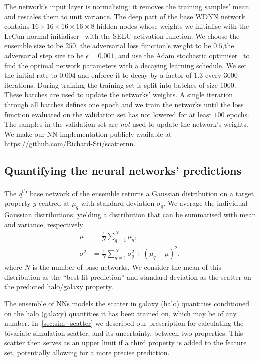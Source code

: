 \documentclass[usenatbib,useAMS]{mnras}
\begin{document}
The network's input layer is normalising: it removes the training samples' mean and rescales them to unit variance. The deep part of the base WDNN network contains $16\times 16\times 16\times 16 \times 8$ hidden nodes whose weights we initialise with the LeCun normal initialiser~\citep{lecun-98b} with the SELU activation function.  We choose the ensemble size to be $250$, the adversarial loss function's weight to be $0.5$,the adversarial step size to be $\epsilon=0.001$, and use the Adam stochastic optimiser~\citep{Adam_Kingma} to find the optimal network parameters with a decaying learning schedule. We set the initial rate to $0.004$ and enforce it to decay by a factor of $1.3$ every $3000$ iterations.
During training the training set is split into batches of size $1000$. These batches are used to update the networks' weights. A single iteration through all batches defines one epoch and we train the networks until the loss function evaluated on the validation set has not lowered for at least $100$ epochs. The samples in the validation set are \emph{not} used to update the network's weights.
We make our \ac{NN} implementation publicly available at \url{https://github.com/Richard-Sti/scatternn}.

\subsection{Quantifying the neural networks' predictions}
\label{sec:NN_prediction}

The {\it q}\textsuperscript{th} base network of the ensemble returns a Gaussian distribution on a target property $y$ centred at $\mu_q$ with standard deviation $\sigma_q$. We average the individual Gaussian distributions, yielding a distribution that can be summarised with mean and variance, respectively
\begin{subequations}\label{eq:Combine NN}
    \begin{align}
        \mu &= \frac{1}{N} \sum_{q=1}^{N} \mu_q,\\
        \sigma^2 &= \frac{1}{N} \sum_{q=1}^{N}\sigma_q^2 + \left(\mu_q - \mu\right)^2,
    \end{align}
\end{subequations}
where $N$ is the number of base networks. We consider the mean of this distribution as the ``best-fit prediction'' and standard deviation as the scatter on the predicted halo/galaxy property.

The ensemble of \acp{NN} models the scatter in galaxy (halo) quantities conditioned on the halo (galaxy) quantities it has been trained on, which may be of any number. In~\cref{sec:sim_scatter} we described our prescription for calculating the bivariate simulation scatter, and its uncertainty, between two properties. This scatter then serves as an upper limit if a third property is added to the feature set, potentially allowing for a more precise prediction.
\end{document}
